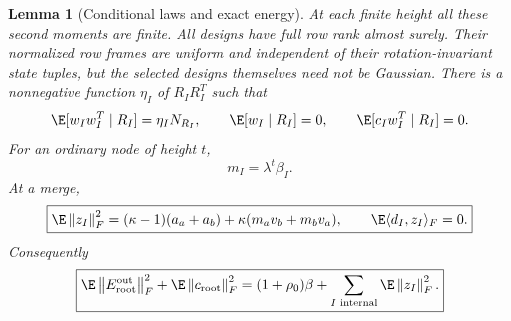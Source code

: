 \documentclass[11pt,oneside,openany,a4paper]{book}
\numberwithin{equation}{chapter}
\newtheorem{lemma}[theorem]{Lemma}
\theoremstyle{definition}
\theoremstyle{remark}
\newcommand{\F}[1]{\left\lVert#1\right\rVert_F}
\begin{document}
\begin{lemma}[Conditional laws and exact energy]\label{budget:lem:inherited}
At each finite height all these second moments are finite. All designs have full row rank almost surely. Their normalized row frames are uniform and independent of their rotation-invariant state tuples, but the selected designs themselves need not be Gaussian. There is a nonnegative function $\eta_I$ of $R_IR_I^T$ such that
\begin{equation}\label{budget:eq:conditional}
 \E[w_Iw_I^T\mid R_I]=\eta_I N_{R_I},\qquad
 \E[w_I\mid R_I]=0,\qquad \E[c_Iw_I^T\mid R_I]=0.
\end{equation}
For an ordinary node of height $t$,
\begin{equation}\label{budget:eq:innovation}
 m_I=\lambda^t\beta_I.
\end{equation}
At a merge,
\begin{equation}\label{budget:eq:cost}
 \boxed{\E\F{z_I}^2=(\kappa-1)(a_a+a_b)+\kappa(m_av_b+m_bv_a),
 \qquad \E\langle d_I,z_I\rangle_F=0.}
\end{equation}
Consequently
\begin{equation}\label{budget:eq:totalenergy}
 \boxed{\E\F{E_{\rm root}^{\rm out}}^2+\E\F{c_{\rm root}}^2
 =(1+\rho_0)\beta+\sum_{I\text{ internal}}\E\F{z_I}^2.}
\end{equation}
\end{lemma}
\end{document}
